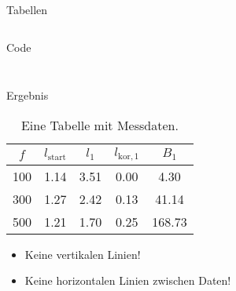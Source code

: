 \begin{frame}[fragile]{
  Tabellen
  \hfill
}
\begin{columns}[onlytextwidth, t]
\begin{column}{0.60\textwidth}
\begin{block}{Code}
\begin{verbatim}
        \end{verbatim}
      \end{block}
    \end{column}
    \begin{column}{0.36\textwidth}
    \end{column}
  \end{columns}
\end{frame}

\begin{frame}{Ergebnis}
  \begin{EmulateArticle}
    \begin{table}
      \centering
      \caption{Eine Tabelle mit Messdaten.}
      \begin{tabular}{c c c c c}
        \toprule
        $f$ & $l_\text{start}$ & $l_1$ & $l_{\text{kor},1}$ & $B_1$ \\
        \midrule
        100 & 1.14 & 3.51 & 0.00 &   4.30 \\
        300 & 1.27 & 2.42 & 0.13 &  41.14 \\
        500 & 1.21 & 1.70 & 0.25 & 168.73 \\
        \toprule
      \end{tabular}
    \end{table}
  \end{EmulateArticle}
  \begin{itemize}
    \item Keine vertikalen Linien!
    \item Keine horizontalen Linien zwischen Daten!
  \end{itemize}
\end{frame}

